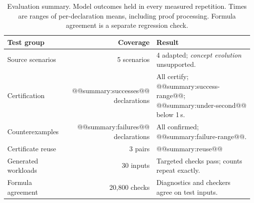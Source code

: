 \begin{table}[htbp]
  \caption{Evaluation summary. Model outcomes held in every measured repetition. Times are ranges of per-declaration means, including proof processing. Formula agreement is a separate regression check.}\label{tab:evaluation-overview}
  \small
  \setlength{\tabcolsep}{4pt}
  \begin{tabularx}{\textwidth}{@{}lrY@{}}
    \toprule Test group & Coverage & Result \\\midrule
    Source scenarios & 5 scenarios & 4 adapted; \textit{concept evolution} unsupported. \\
    Certification & @@summary:successes@@ declarations & All certify; @@summary:success-range@@; @@summary:under-second@@ below 1\,s. \\
    Counterexamples & @@summary:failures@@ declarations & All confirmed; @@summary:failure-range@@. \\
    Certificate reuse & 3 pairs & @@summary:reuse@@ \\
    Generated workloads & 30 inputs & Targeted checks pass; counts repeat exactly. \\
    Formula agreement & 20,800 checks & Diagnostics and checkers agree on test inputs. \\
    \bottomrule
  \end{tabularx}
\end{table}
